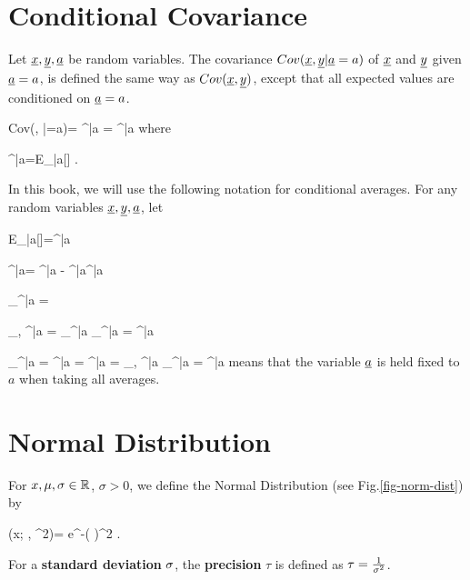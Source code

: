 \section{Conditional Covariance}
\label{sec-cond-cov}
Let $\rvx, \rvy, \rva$
be random variables.
The covariance $Cov(\rvx, \rvy|\rva=a)$
of $\rvx$ and $\rvy$
given $\rva=a$, is defined
the same
way as $Cov(\rvx, \rvy)$,
except that all
expected values are
conditioned on $\rva=a$.



\beq
Cov(\rvx, \rvy|\rva=a)=
\av{\rvx, \rvy}^{|a}
=
^{|a}
\eeq
where

\beq
\av{\rvx}^{|a}=E_{\rvx|a}[\rvx]
\;.
\eeq

In this book, we will use the following notation
for conditional averages.
For any random
variables $\rvx, \rvy, \rva$, let

\beq
E_{|a}[\rvx]=\av{\rvx}^{|a}
\quad{}
\eeq

\beq
\av{\rvx, \rvy}^{|a}=
\av{\rvx\rvy}^{|a}
-
\av{\rvx}^{|a}\av{\rvy}^{|a}
\quad{}
\eeq

\beq
\s_\rvx^{|a} =
\quad {}
\eeq

\beq
\rho_{\rvx, \rvy}^{|a}
=
{\s_\rvx^{|a} \s_\rvy^{|a}}
=
\left[
\frac{\av{\rvx, \rvy}}
{\s_\rvx \s_\rvy}
\right]^{|a}
\quad {}
\eeq

\beq
\partial_\rvx^{|a}\rvy
=
\left[\pder{}{\rvx}\right]^{|a}\rvy
=
{\av{\rvx, \rvx}^{|a}}
=
\rho_{\rvx, \rvy}^{|a}
{\s_\rvx^{|a}}
=
\left[
\rho_{\rvx, \rvy}\frac{
\s_\rvy}
{\s_\rvx}\right]^{|a}
\quad{}
\eeq
{} means that the variable
$\rva$ is held fixed to $a$
when taking all averages.





\section{Normal Distribution}


For $x, \mu, \sigma\in { \mathbb{R}}$,
$\sigma >0$, we define the Normal Distribution
(see Fig.\ref{fig-norm-dist}) by

\beq
\caln(x; \mu, \sigma^2)=
e^{-\;\left(
\right)^2}
\;.
\eeq

For a {\bf standard deviation}
$\sigma$, the {\bf precision} $\tau$
is defined as $\tau=\frac{1}{\sigma^2}$.

